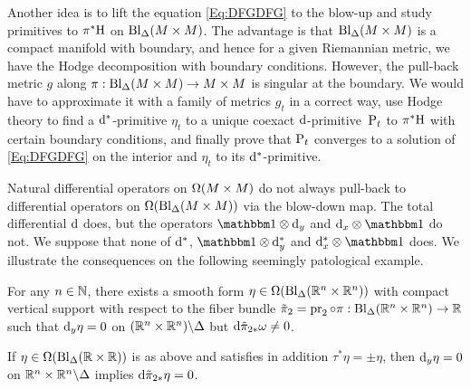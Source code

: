 \documentclass[\MainFolder/Text.tex]{subfiles}
\begin{document}
Another idea is to lift the equation \eqref{Eq:DFGDFG} to the blow-up and study primitives to $\pi^*\mathrm{H}$ on $\mathrm{Bl}_\Delta(M\times M)$. The advantage is that $\mathrm{Bl}_\Delta(M\times M)$ is a compact manifold with boundary, and hence for a given Riemannian metric, we have the Hodge decomposition with boundary conditions.  However, the pull-back metric $g$ along $\pi : \mathrm{Bl}_\Delta(M\times M)\rightarrow M\times M$ is singular at the boundary. We would have to approximate it with a family of metrics $g_t$ in a correct way, use Hodge theory to find a $\mathrm{d}^*$-primitive $\eta_t$ to a unique coexact $\mathrm{d}$-primitive~$\mathrm{P}_t$ to $\pi^*\mathrm{H}$ with certain boundary conditions, and finally prove that $\mathrm{P}_t$ converges to a solution of \eqref{Eq:DFGDFG} on the interior and $\eta_t$ to its $\mathrm{d}^*$-primitive.

Natural differential operators on $\Omega(M\times M)$ do not always pull-back to differential operators on $\Omega(\mathrm{Bl}_\Delta(M\times M))$ via the blow-down map. The total differential $\mathrm{d}$ does, but the operators $\Id \otimes \Dd_y$ and $\Dd_x \otimes \Id$ do not. We suppose that none of $\mathrm{d}^*$, $\Id \otimes \CoDd_y$ and $\CoDd_x \otimes \Id$ does. We illustrate the consequences on the following seemingly patological example.
%
\begin{Proposition}\label{Prop:PatEm}
For any $n\in \mathbb{N}$, there exists a smooth form $\eta \in \Omega(\mathrm{Bl}_\Delta(\mathbb{R}^n\times \mathbb{R}^n))$ with compact vertical support with respect to the fiber bundle $\tilde{\pi}_2 = \operatorname{\mathrm{pr}}_2 \circ \pi : \mathrm{Bl}_\Delta(\mathbb{R}^n\times \mathbb{R}^n) \rightarrow \mathbb{R}$ such that $\mathrm{d}_y \eta = 0$ on $(\mathbb{R}^n\times \mathbb{R}^n)\backslash \Delta$ but $\mathrm{d} \tilde{\pi}_{2*}\omega \neq 0$.

If $\eta \in \Omega(\mathrm{Bl}_\Delta(\mathbb{R}\times \mathbb{R}))$ is as above and satisfies in addition $\tau^* \eta = \pm \eta$, then $\mathrm{d}_y \eta = 0$ on $\mathbb{R}^n\times \mathbb{R}^n \backslash \Delta$ implies $\mathrm{d} \tilde{\pi}_{2*}\eta = 0$.
\end{Proposition}
\end{document}
